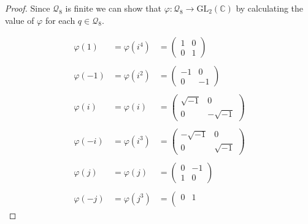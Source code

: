 \documentclass[10pt]{article}
\newcommand{\bb}[1]{\mathbb{#1}}
\theoremstyle{plain}
\theoremstyle{remark}
\begin{document}
\begin{proof}
  Since $\mathcal{Q}_8$ is finite we can show that $\varphi:\mathcal{Q}_8\rightarrow \text{GL}_2(\bb{C})$
  by calculating the value of $\varphi$ for each $q\in\mathcal{Q}_8$.

  \[
    \begin{array}{ccc}
      
      \varphi(1)  &= \varphi(i^4) &=
                       \left(\begin{array}{cc}
                               1&0\\
                               0&1
                             \end{array}\right)\\\\
      \varphi(-1) &= \varphi(i^2) &=
                       \left(\begin{array}{cc}
                               -1&0\\
                               0&-1
                             \end{array}\right)\\\\
      \varphi(i)  &= \varphi(i)  &=
                       \left(\begin{array}{cc}
                               \sqrt{-1}&0\\
                               0&-\sqrt{-1}
                             \end{array}\right)\\\\
      \varphi(-i) &= \varphi(i^3) &=
                       \left(\begin{array}{cc}
                               -\sqrt{-1}&0\\
                               0&\sqrt{-1}
                             \end{array}\right)\\\\
      \varphi(j)  &= \varphi(j)  &=
                       \left(\begin{array}{cc}
                               0&-1\\
                               1&0
                             \end{array}\right)\\\\
      \varphi(-j) &= \varphi(j^3) &=
                       \left(\begin{array}{cc}
                               0&1\\

\end{array}
\end{array}\]
\end{proof}
\end{document}
